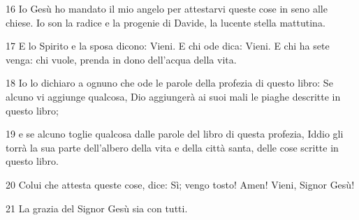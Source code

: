 \par 16 Io Gesù ho mandato il mio angelo per attestarvi queste cose in seno alle chiese. Io son la radice e la progenie di Davide, la lucente stella mattutina.
\par 17 E lo Spirito e la sposa dicono: Vieni. E chi ode dica: Vieni. E chi ha sete venga: chi vuole, prenda in dono dell'acqua della vita.
\par 18 Io lo dichiaro a ognuno che ode le parole della profezia di questo libro: Se alcuno vi aggiunge qualcosa, Dio aggiungerà ai suoi mali le piaghe descritte in questo libro;
\par 19 e se alcuno toglie qualcosa dalle parole del libro di questa profezia, Iddio gli torrà la sua parte dell'albero della vita e della città santa, delle cose scritte in questo libro.
\par 20 Colui che attesta queste cose, dice: Sì; vengo tosto! Amen! Vieni, Signor Gesù!
\par 21 La grazia del Signor Gesù sia con tutti.


